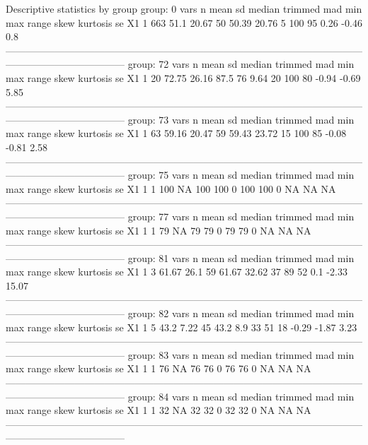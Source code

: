 \documentclass[a4paper,headsepline,footsepline,fontsize=11pt,BCOR=12mm,DIV=12]{report}
\begin{document}
 Descriptive statistics by group 
group: 0
   vars   n mean    sd median trimmed   mad min max range skew kurtosis  se
X1    1 663 51.1 20.67     50   50.39 20.76   5 100    95 0.26    -0.46 0.8
------------------------------------------------------------------------------------------------------------------------------------------------ 
group: 72
   vars  n  mean    sd median trimmed  mad min max range  skew kurtosis   se
X1    1 20 72.75 26.16   87.5      76 9.64  20 100    80 -0.94    -0.69 5.85
------------------------------------------------------------------------------------------------------------------------------------------------ 
group: 73
   vars  n  mean    sd median trimmed   mad min max range  skew kurtosis   se
X1    1 63 59.16 20.47     59   59.43 23.72  15 100    85 -0.08    -0.81 2.58
------------------------------------------------------------------------------------------------------------------------------------------------ 
group: 75
   vars n mean sd median trimmed mad min max range skew kurtosis se
X1    1 1  100 NA    100     100   0 100 100     0   NA       NA NA
------------------------------------------------------------------------------------------------------------------------------------------------ 
group: 77
   vars n mean sd median trimmed mad min max range skew kurtosis se
X1    1 1   79 NA     79      79   0  79  79     0   NA       NA NA
------------------------------------------------------------------------------------------------------------------------------------------------ 
group: 81
   vars n  mean   sd median trimmed   mad min max range skew kurtosis    se
X1    1 3 61.67 26.1     59   61.67 32.62  37  89    52  0.1    -2.33 15.07
------------------------------------------------------------------------------------------------------------------------------------------------ 
group: 82
   vars n mean   sd median trimmed mad min max range  skew kurtosis   se
X1    1 5 43.2 7.22     45    43.2 8.9  33  51    18 -0.29    -1.87 3.23
------------------------------------------------------------------------------------------------------------------------------------------------ 
group: 83
   vars n mean sd median trimmed mad min max range skew kurtosis se
X1    1 1   76 NA     76      76   0  76  76     0   NA       NA NA
------------------------------------------------------------------------------------------------------------------------------------------------ 
group: 84
   vars n mean sd median trimmed mad min max range skew kurtosis se
X1    1 1   32 NA     32      32   0  32  32     0   NA       NA NA
------------------------------------------------------------------------------------------------------------------------------------------------ 
\end{document}
